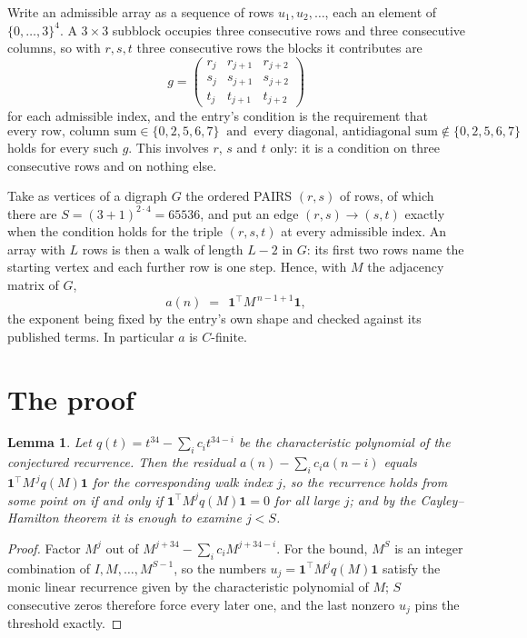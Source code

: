 \documentclass[11pt,a4paper]{article}
\theoremstyle{plain}
\newtheorem{lemma}[theorem]{Lemma}
\theoremstyle{definition}
\begin{document}
Write an admissible array as a sequence of rows $u_1,u_2,\dots$, each an element of
$\{0,\dots,3\}^{4}$. A $3\times3$ subblock occupies three consecutive rows and
three consecutive columns, so with $r,s,t$ three consecutive rows the blocks it
contributes are
\[
g=\begin{pmatrix}r_j&r_{j+1}&r_{j+2}\\ s_j&s_{j+1}&s_{j+2}\\ t_j&t_{j+1}&t_{j+2}\end{pmatrix}
\]
for each admissible index, and the entry's condition is the requirement that
\[
\text{every row, column sum} \in \{0,2,5,6,7\}\ \text{ and }\ \text{every diagonal, antidiagonal sum} \notin \{0,2,5,6,7\}
\]
holds for every such $g$. This involves $r$, $s$ and $t$ only: it is a condition on
three consecutive rows and on nothing else.

Take as vertices of a digraph $G$ the ordered PAIRS $(r,s)$ of rows, of which there are
$S=(3+1)^{2\cdot4}=65536$, and put an edge $(r,s)\to(s,t)$ exactly when the condition
holds for the triple $(r,s,t)$ at every admissible index. An array with $L$ rows is then a
walk of length $L-2$ in $G$: its first two rows name the starting vertex and each further
row is one step. Hence, with $M$ the adjacency matrix of $G$,
\[
a(n)\;=\;\,\mathbf{1}^{\!\top}M^{\,n-1+1}\mathbf{1},
\]
the exponent being fixed by the entry's own shape and checked against its published terms.
In particular $a$ is $C$-finite.

\section{The proof}

\begin{lemma}\label{lem:crit}
Let $q(t)=t^{34}-\sum_i c_it^{34-i}$ be the characteristic polynomial of the
conjectured recurrence. Then the residual $a(n)-\sum_ic_ia(n-i)$ equals
$\mathbf{1}^{\!\top}M^{\,j}q(M)\mathbf{1}$ for the corresponding walk index
$j$, so the recurrence holds from some point on if and only if
$\mathbf{1}^{\!\top}M^{j}q(M)\mathbf{1}=0$ for all large $j$; and by the
Cayley--Hamilton theorem it is enough to examine $j<S$.
\end{lemma}

\begin{proof}
Factor $M^{j}$ out of $M^{j+34}-\sum_ic_iM^{j+34-i}$. For the bound, $M^{S}$
is an integer combination of $I,M,\dots,M^{S-1}$, so the numbers
$u_j=\mathbf{1}^{\!\top}M^{j}q(M)\mathbf{1}$ satisfy the monic linear recurrence given by
the characteristic polynomial of $M$; $S$ consecutive zeros therefore force every later one,
and the last nonzero $u_j$ pins the threshold exactly.
\end{proof}
\end{document}
